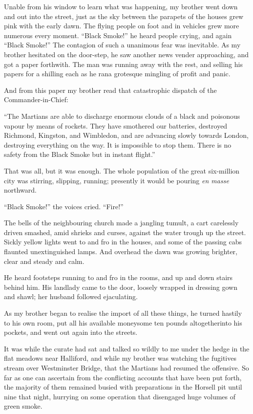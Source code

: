 Unable from his window to learn what was happening, my brother went
down and out into the street, just as the sky between the parapets
of the houses grew pink with the early dawn. The flying people on
foot and in vehicles grew more numerous every moment. ``Black
Smoke!'' he heard people crying, and again ``Black Smoke!'' The
contagion of such a unanimous fear was inevitable. As my brother
hesitated on the door-step, he saw another news vender approaching,
and got a paper forthwith. The man was running away with the rest,
and selling his papers for a shilling each as he ran\dash{}a grotesque
mingling of profit and panic.

And from this paper my brother read that catastrophic dispatch of
the Commander-in-Chief:

``The Martians are able to discharge enormous clouds of a black and
poisonous vapour by means of rockets. They have smothered our
batteries, destroyed Richmond, Kingston, and Wimbledon, and are
advancing slowly towards London, destroying everything on the way.
It is impossible to stop them. There is no safety from the Black
Smoke but in instant flight.''

That was all, but it was enough. The whole population of the great
six-million city was stirring, slipping, running; presently it
would be pouring \emph{en masse} northward.

``Black Smoke!'' the voices cried. ``Fire!''

The bells of the neighbouring church made a jangling tumult, a cart
carelessly driven smashed, amid shrieks and curses, against the
water trough up the street. Sickly yellow lights went to and fro in
the houses, and some of the passing cabs flaunted unextinguished
lamps. And overhead the dawn was growing brighter, clear and steady
and calm.

He heard footsteps running to and fro in the rooms, and up and down
stairs behind him. His landlady came to the door, loosely wrapped
in dressing gown and shawl; her husband followed ejaculating.

As my brother began to realise the import of all these things, he
turned hastily to his own room, put all his available money\dash{}some
ten pounds altogether\dash{}into his pockets, and went out again into
the streets.

It was while the curate had sat and talked so wildly to me under
the hedge in the flat meadows near Halliford, and while my brother
was watching the fugitives stream over Westminster Bridge, that the
Martians had resumed the offensive. So far as one can ascertain
from the conflicting accounts that have been put forth, the
majority of them remained busied with preparations in the Horsell
pit until nine that night, hurrying on some operation that
disengaged huge volumes of green smoke.

